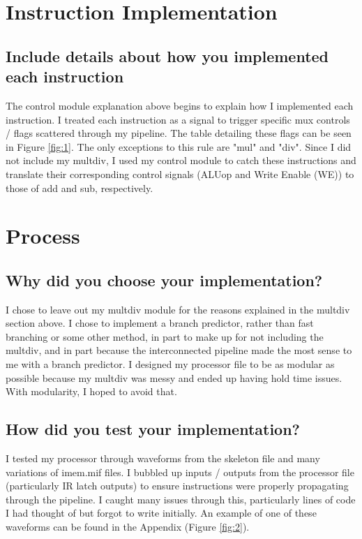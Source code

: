 \documentclass[letterpaper]{article} %
\begin{document}
\section{Instruction Implementation}
\subsection{Include details about how you implemented each instruction}
The control module explanation above begins to explain how I implemented each instruction. I treated each instruction as a signal to trigger specific mux controls / flags scattered through my pipeline. The table detailing these flags can be seen in Figure \ref{fig:1}. The only exceptions to this rule are "mul" and "div". Since I did not include my multdiv, I used my control module to catch these instructions and translate their corresponding control signals (ALUop and Write Enable (WE)) to those of add and sub, respectively.

\section{Process}
\subsection{Why did you choose your implementation?}
I chose to leave out my multdiv module for the reasons explained in the multdiv section above. I chose to implement a branch predictor, rather than fast branching or some other method, in part to make up for not including the multdiv, and in part because the interconnected pipeline made the most sense to me with a branch predictor. I designed my processor file to be as modular as possible because my multdiv was messy and ended up having hold time issues. With modularity, I hoped to avoid that.

\subsection{How did you test your implementation?}
I tested my processor through waveforms from the skeleton file and many variations of imem.mif files. I bubbled up inputs / outputs from the processor file (particularly IR latch outputs) to ensure instructions were properly propagating through the pipeline. I caught many issues through this, particularly lines of code I had thought of but forgot to write initially. An example of one of these waveforms can be found in the Appendix (Figure \ref{fig:2}).
\end{document}
